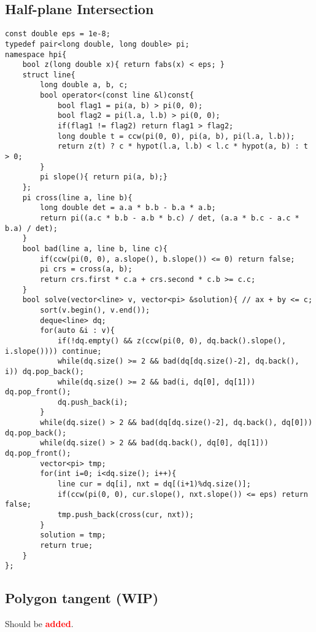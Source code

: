 \documentclass[landscape, 10pt, a4paper, oneside,  twocolumn]{article}
\newcommand{\added}{Should be \textcolor{red}{\textbf{added}}.}
\begin{document}
\subsection{Half-plane Intersection}
\begin{verbatim}
const double eps = 1e-8;
typedef pair<long double, long double> pi;
namespace hpi{
	bool z(long double x){ return fabs(x) < eps; }
	struct line{
		long double a, b, c;
		bool operator<(const line &l)const{
			bool flag1 = pi(a, b) > pi(0, 0);
			bool flag2 = pi(l.a, l.b) > pi(0, 0);
			if(flag1 != flag2) return flag1 > flag2;
			long double t = ccw(pi(0, 0), pi(a, b), pi(l.a, l.b));
			return z(t) ? c * hypot(l.a, l.b) < l.c * hypot(a, b) : t > 0;
		}
		pi slope(){ return pi(a, b);}
	}; 
	pi cross(line a, line b){
		long double det = a.a * b.b - b.a * a.b;
		return pi((a.c * b.b - a.b * b.c) / det, (a.a * b.c - a.c * b.a) / det);
	}
	bool bad(line a, line b, line c){
		if(ccw(pi(0, 0), a.slope(), b.slope()) <= 0) return false;
		pi crs = cross(a, b);
		return crs.first * c.a + crs.second * c.b >= c.c;
	}
	bool solve(vector<line> v, vector<pi> &solution){ // ax + by <= c;
		sort(v.begin(), v.end());
		deque<line> dq;
		for(auto &i : v){
			if(!dq.empty() && z(ccw(pi(0, 0), dq.back().slope(), i.slope()))) continue;
			while(dq.size() >= 2 && bad(dq[dq.size()-2], dq.back(), i)) dq.pop_back();
			while(dq.size() >= 2 && bad(i, dq[0], dq[1])) dq.pop_front();
			dq.push_back(i);
		}
		while(dq.size() > 2 && bad(dq[dq.size()-2], dq.back(), dq[0])) dq.pop_back();
		while(dq.size() > 2 && bad(dq.back(), dq[0], dq[1])) dq.pop_front();
		vector<pi> tmp;
		for(int i=0; i<dq.size(); i++){
			line cur = dq[i], nxt = dq[(i+1)%dq.size()];
			if(ccw(pi(0, 0), cur.slope(), nxt.slope()) <= eps) return false;
			tmp.push_back(cross(cur, nxt));
		}
		solution = tmp;
		return true;
	}
};
\end{verbatim}

\subsection{Polygon tangent (WIP)}
\added
\end{document}
